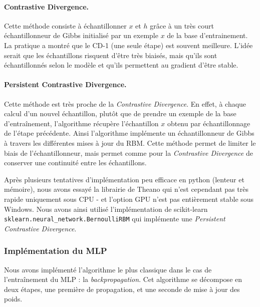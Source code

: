 \documentclass[10pt,a4paper]{article}
\begin{document}
\paragraph{Contrastive Divergence. } Cette méthode consiste à échantillonner $x$ et $h$ grâce à un très court échantillonneur de Gibbs initialisé par un exemple $x$ de la base d'entrainement. La pratique a montré que le CD-1 (une seule étape) est souvent meilleure. L'idée serait que les échantillons risquent d'être très biaisés, mais qu'ils sont échantillonnés selon le modèle et qu'ils permettent au gradient d'être stable.


\paragraph{Persistent Contrastive Divergence. } Cette méthode est très proche de la \textit{Contrastive Divergence}. En effet, à chaque calcul d'un nouvel échantillon, plutôt que de prendre un exemple de la base d'entraînement, l'algorithme récupère l'échantillon $x$ obtenu par échantillonnage de l'étape précédente. Ainsi l'algorithme implémente un échantillonneur de Gibbs à travers les différentes mises à jour du RBM. Cette méthode permet de limiter le biais de l'échantillonneur, mais permet comme pour la \textit{Contrastive Divergence} de conserver une continuité entre les échantillons.


Après plusieurs tentatives d'implémentation peu efficace en python (lenteur et mémoire), nous avons essayé la librairie de Theano qui n'est cependant pas très rapide uniquement sous CPU - et l'option GPU n'est pas entièrement stable sous Windows. Nous avons ainsi utilisé l'implémentation de scikit-learn \texttt{sklearn.neural\_network.BernoulliRBM} qui implémente une \textit{Persistent Contrastive Divergence}.




\subsubsection{Implémentation du MLP}

Nous avons implémenté l'algorithme le plus classique dans le cas de l'entraînement du MLP : la \emph{backpropagation}. Cet algorithme se décompose en deux étapes, une première de propagation, et une seconde de mise à jour des poids. 
\end{document}
